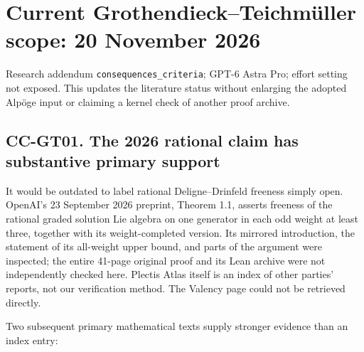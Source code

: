 \documentclass[11pt,a4paper]{article}
\theoremstyle{definition}\newtheorem{definition}[theorem]{Definition}
\theoremstyle{remark}\newtheorem{remark}[theorem]{Remark}
\begin{document}
\section{Current Grothendieck--Teichmüller scope: 20 November
2026}\label{current-grothendieckteichmuxfcller-scope-20-november-2026}

Research addendum \nolinkurl{consequences_criteria}; GPT-6 Astra Pro;
effort setting not exposed. This updates the literature status without
enlarging the adopted Alpöge input or claiming a kernel check of another
proof archive.

\subsection{CC-GT01. The 2026 rational claim has substantive primary
support}\label{cc-gt01.-the-2026-rational-claim-has-substantive-primary-support}

It would be outdated to label rational Deligne--Drinfeld freeness simply
open. OpenAI's 23 September 2026 preprint, Theorem 1.1, asserts freeness
of the rational graded solution Lie algebra on one generator in each odd
weight at least three, together with its weight-completed version. Its
mirrored introduction, the statement of its all-weight upper bound, and
parts of the argument were inspected; the entire 41-page original proof
and its Lean archive were not independently checked here. Plectis Atlas
itself is an index of other parties' reports, not our verification
method. The Valency page could not be retrieved directly.

Two subsequent primary mathematical texts supply stronger evidence than
an index entry:
\end{document}

